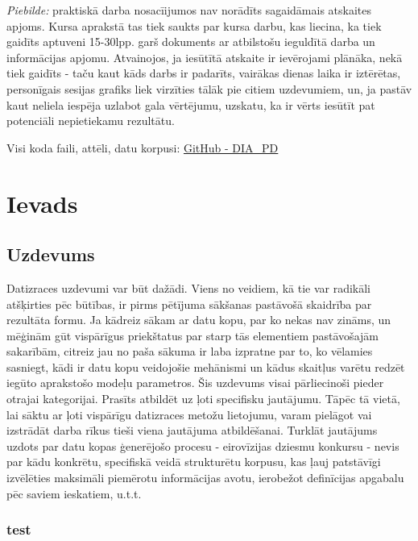 \documentclass[12pt, a4paper]{article}
\begin{document}

\newpage
\tableofcontents
\thispagestyle{empty}
\newpage
\setcounter{page}{3}

\textit{Piebilde:} praktiskā darba nosacīijumos nav norādīts sagaidāmais atskaites apjoms. Kursa aprakstā tas tiek saukts par kursa darbu, kas liecina, ka tiek gaidīts aptuveni 15-30lpp. garš dokuments ar atbilstošu ieguldītā darba un informācijas apjomu. Atvainojos, ja iesūtītā atskaite ir ievērojami plānāka, nekā tiek gaidīts - taču kaut kāds darbs ir padarīts, vairākas dienas laika ir iztērētas, personīgais sesijas grafiks liek virzīties tālāk pie citiem uzdevumiem, un, ja pastāv kaut neliela iespēja uzlabot gala vērtējumu, uzskatu, ka ir vērts iesūtīt pat potenciāli nepietiekamu rezultātu.

Visi koda faili, attēli, datu korpusi: \href{https://github.com/peteris-racinskis/DIA_PD}{GitHub - DIA\_PD}


\section{Ievads}

\subsection{Uzdevums}
Datizraces uzdevumi var būt dažādi. Viens no veidiem, kā tie var radikāli atšķirties pēc būtības, ir pirms pētījuma sākšanas pastāvošā skaidrība par rezultāta formu. Ja kādreiz sākam ar datu kopu, par ko nekas nav zināms, un mēģinām gūt vispārīgus priekštatus par starp tās elementiem pastāvošajām sakarībām, citreiz jau no paša sākuma ir laba izpratne par to, ko vēlamies sasniegt, kādi ir datu kopu veidojošie mehānismi un kādus skaitļus varētu redzēt iegūto aprakstošo modeļu parametros. Šis uzdevums visai pārliecinoši pieder otrajai kategorijai. Prasīts atbildēt uz ļoti specifisku jautājumu. Tāpēc tā vietā, lai sāktu ar ļoti vispārīgu datizraces metožu lietojumu, varam pielāgot vai izstrādāt darba rīkus tieši viena jautājuma atbildēšanai. Turklāt jautājums uzdots par datu kopas ģenerējošo procesu - eirovīzijas dziesmu konkursu - nevis par kādu konkrētu, specifiskā veidā strukturētu korpusu, kas ļauj patstāvīgi izvēlēties maksimāli piemērotu informācijas avotu, ierobežot definīcijas apgabalu pēc saviem ieskatiem, u.t.t.

\subsubsection{test}
\end{document}
